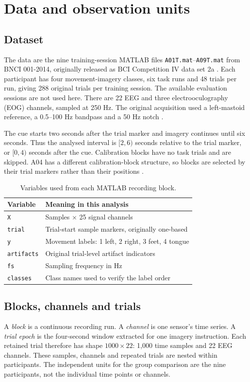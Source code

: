 \documentclass[11pt,a4paper]{article}
\begin{document}
\section{Data and observation units}
\subsection{Dataset}
The data are the nine training-session MATLAB files \texttt{A01T.mat}--\texttt{A09T.mat} from BNCI 001-2014, originally released as BCI Competition IV data set 2a \cite{bnci,brunner2008}. Each participant has four movement-imagery classes, six task runs and 48 trials per run, giving 288 original trials per training session. The available evaluation sessions are not used here. There are 22 EEG and three electrooculography (EOG) channels, sampled at 250 Hz. The original acquisition used a left-mastoid reference, a 0.5--100 Hz bandpass and a 50 Hz notch \cite{brunner2008}.

The cue starts two seconds after the trial marker and imagery continues until six seconds. Thus the analysed interval is $[2,6)$ seconds relative to the trial marker, or $[0,4)$ seconds after the cue. Calibration blocks have no task trials and are skipped. A04 has a different calibration-block structure, so blocks are selected by their trial markers rather than their positions \cite{brunner2008}.

\begin{table}[htbp]
\centering
\caption{Variables used from each MATLAB recording block.}
\begin{tabular}{ll}
\toprule Variable & Meaning in this analysis \\
\midrule
\texttt{X} & Samples $\times$ 25 signal channels \\
\texttt{trial} & Trial-start sample markers, originally one-based \\
\texttt{y} & Movement labels: 1 left, 2 right, 3 feet, 4 tongue \\
\texttt{artifacts} & Original trial-level artifact indicators \\
\texttt{fs} & Sampling frequency in Hz \\
\texttt{classes} & Class names used to verify the label order \\
\bottomrule
\end{tabular}
\end{table}

\subsection{Blocks, channels and trials}
A \emph{block} is a continuous recording run. A \emph{channel} is one sensor's time series. A \emph{trial epoch} is the four-second window extracted for one imagery instruction. Each retained trial therefore has shape $1000\times22$: 1,000 time samples and 22 EEG channels. These samples, channels and repeated trials are nested within participants. The independent units for the group comparison are the nine participants, not the individual time points or channels.
\end{document}
